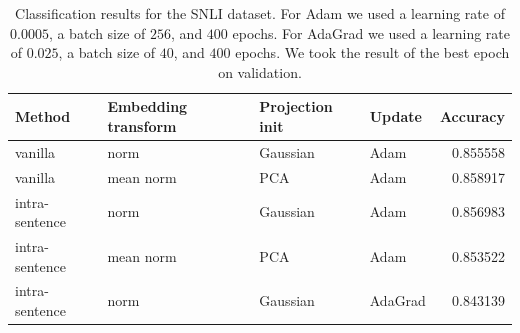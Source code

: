 \documentclass{article}
\begin{document}
\begin{table}[htbp]\centering
\begin{tabular}{|l|l|l|l|r|}
    \hline
    Method         & Embedding transform & Projection init & Update  & Accuracy \\ \hline
    vanilla        & norm                & Gaussian        & Adam    & 0.855558 \\
    vanilla        & mean norm           & PCA             & Adam    & 0.858917 \\
    intra-sentence & norm                & Gaussian        & Adam    & 0.856983 \\
    intra-sentence & mean norm           & PCA             & Adam    & 0.853522 \\
    intra-sentence & norm                & Gaussian        & AdaGrad & 0.843139 \\
    \hline
\end{tabular}
\caption{Classification results for the SNLI dataset. For Adam we used a learning rate of $0.0005$, a batch size of $256$, and $400$ epochs. For AdaGrad we used a learning rate of $0.025$, a batch size of $40$, and $400$ epochs. We took the result of the best epoch on validation.}
\label{table:results}
\end{table}
\end{document}
